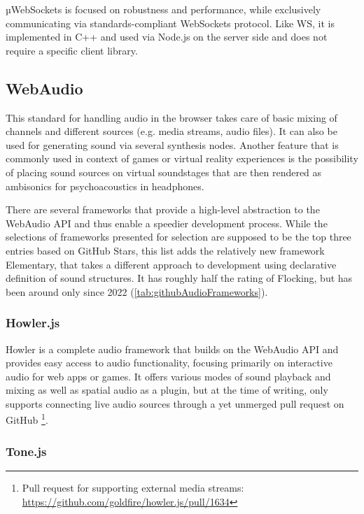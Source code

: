 µWebSockets is focused on robustness and performance, while exclusively communicating via standards-compliant WebSockets protocol. Like WS, it is implemented in C++ and used via Node.js on the server side and does not require a specific client library.

\subsection{WebAudio}

This standard for handling audio in the browser takes care of basic mixing of channels and different sources (e.g. media streams, audio files). It can also be used for generating sound via several synthesis nodes. Another feature that is commonly used in context of games or virtual reality experiences is the possibility of placing sound sources on virtual soundstages that are then rendered as ambisonics for psychoacoustics in headphones.

There are several frameworks that provide a high-level abstraction to the WebAudio \ac{API} and thus enable a speedier development process. While the selections of frameworks presented for selection are supposed to be the top three entries based on GitHub Stars, this list adds the relatively new framework Elementary, that takes a different approach to development using declarative definition of sound structures. It has roughly half the rating of Flocking, but has been around only since 2022 (\ref{tab:githubAudioFrameworks}).



\subsubsection{Howler.js}

Howler is a complete audio framework that builds on the WebAudio \ac{API} and provides easy access to audio functionality, focusing primarily on interactive audio for web apps or games. It offers various modes of sound playback and mixing as well as spatial audio as a plugin, but at the time of writing, only supports connecting live audio sources through a yet unmerged pull request on GitHub \footnote{Pull request for supporting external media streams: \href{https://github.com/goldfire/howler.js/pull/1634}{https://github.com/goldfire/howler.js/pull/1634}}.

\subsubsection{Tone.js}

